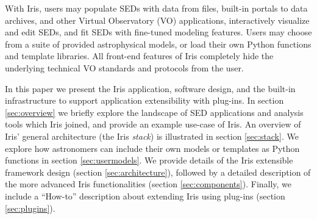 \documentclass[5p]{elsarticle}
\begin{document}
With Iris, users may populate SEDs with data from files, built-in portals to data archives, and other Virtual Observatory (VO) applications, interactively visualize and edit SEDs, and fit SEDs with fine-tuned modeling features. Users may choose from a suite of provided astrophysical models, or load their own Python functions and template libraries. All front-end features of Iris completely hide the underlying technical VO standards and protocols from the user.




In this paper we present the Iris application, software design, and the built-in infrastructure to support application extensibility with plug-ins. In section \ref{sec:overview} we briefly explore the landscape of SED applications and analysis tools which Iris joined, and provide an example use-case of Iris. An overview of Iris' general architecture (the Iris \emph{stack}) is illustrated in section \ref{sec:stack}. We explore how astronomers can include their own models or templates as Python functions in section \ref{sec:usermodels}. We provide details of the Iris extensible framework design (section \ref{sec:architecture}), followed by a detailed description of the more advanced Iris functionalities (section \ref{sec:components}). Finally, we include a ``How-to'' description about extending Iris using plug-ins (section \ref{sec:plugins}).
\end{document}
